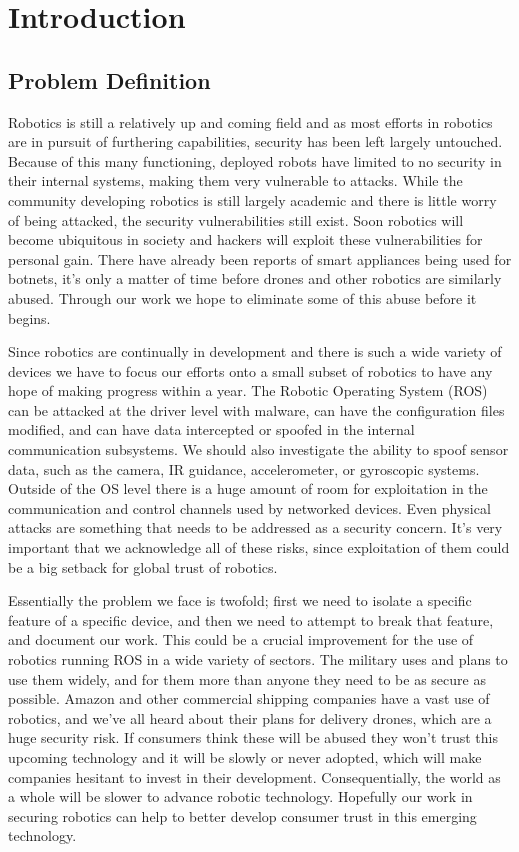 \documentclass[IEEEtran,letterpaper,10pt,notitlepage,draftclsnofoot,onecolumn]{article}
\begin{document}
\newpage
{}
\tableofcontents
\clearpage

\section{Introduction}
\subsection{Problem Definition}
Robotics is still a relatively up and coming field and as most efforts in robotics are in pursuit of furthering capabilities, security has been left largely untouched.
Because of this many functioning, deployed robots have limited to no security in their internal systems, making them very vulnerable to attacks.
While the community developing robotics is still largely academic and there is little worry of being attacked, the security vulnerabilities still exist.
Soon robotics will become ubiquitous in society and hackers will exploit these vulnerabilities for personal gain.
There have already been reports of smart appliances being used for botnets, it's only a matter of time before drones and other robotics are similarly abused. \cite{ddos}
Through our work we hope to eliminate some of this abuse before it begins.

Since robotics are continually in development and there is such a wide variety of devices we have to focus our efforts onto a small subset of robotics to have any hope of making progress within a year.
The Robotic Operating System (ROS) can be attacked at the driver level with malware, can have the configuration files modified, and can have data intercepted or spoofed in the internal communication subsystems.
We should also investigate the ability to spoof sensor data, such as the camera, IR guidance, accelerometer, or gyroscopic systems.
Outside of the OS level there is a huge amount of room for exploitation in the communication and control channels used by networked devices.
Even physical attacks are something that needs to be addressed as a security concern.
It's very important that we acknowledge all of these risks, since exploitation of them could be a big setback for global trust of robotics.

Essentially the problem we face is twofold; first we need to isolate a specific feature of a specific device, and then we need to attempt to break that feature, and document our work.
This could be a crucial improvement for the use of robotics running ROS in a wide variety of sectors.
The military uses and plans to use them widely, and for them more than anyone they need to be as secure as possible.
Amazon and other commercial shipping companies have a vast use of robotics, and we've all heard about their plans for delivery drones, which are a huge security risk.
If consumers think these will be abused they won't trust this upcoming technology and it will be slowly or never adopted, which will make companies hesitant to invest in their development.
Consequentially, the world as a whole will be slower to advance robotic technology.
Hopefully our work in securing robotics can help to better develop consumer trust in this emerging technology.
\end{document}
